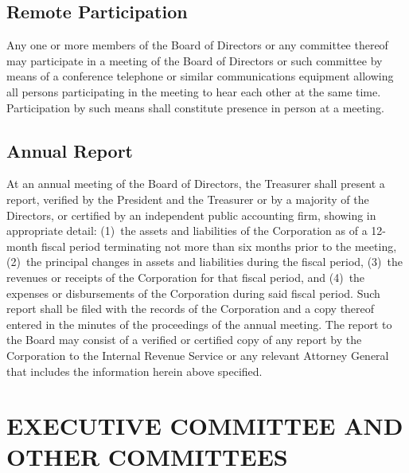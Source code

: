 \documentclass{article}
\begin{document}
\subsection{Remote Participation}
Any one or more members of the Board of Directors or any committee thereof may participate in a meeting of the Board of Directors or such committee by means of a conference telephone or similar communications equipment allowing all persons participating in the meeting to hear each other at the same time.  Participation by such means shall constitute presence in person at a meeting.
\subsection{Annual Report}
At an annual meeting of the Board of Directors, the Treasurer shall present a report, verified by the President and the Treasurer or by a majority of the Directors, or certified by an independent public accounting firm, showing in appropriate detail:  (1) the assets and liabilities of the Corporation as of a 12-month fiscal period terminating not more than six months prior to the meeting, (2) the principal changes in assets and liabilities during the fiscal period, (3) the revenues or receipts of the Corporation for that fiscal period, and (4) the expenses or disbursements of the Corporation during said fiscal period.  Such report shall be filed with the records of the Corporation and a copy thereof entered in the minutes of the proceedings of the annual meeting.  The report to the Board may consist of a verified or certified copy of any report by the Corporation to the Internal Revenue Service or any relevant Attorney General that includes the information herein above specified.
\section{EXECUTIVE COMMITTEE AND OTHER COMMITTEES}
\end{document}
